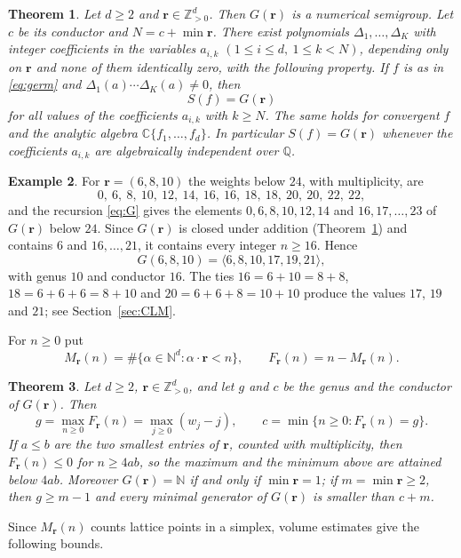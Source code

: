 \documentclass{amsart}
\newtheorem{theorem}{Theorem}[section]
\theoremstyle{definition}
\newtheorem{example}[theorem]{Example}
\numberwithin{equation}{section}
\newcommand{\N}{\mathbb{N}}
\newcommand{\Z}{\mathbb{Z}}
\newcommand{\Q}{\mathbb{Q}}
\newcommand{\C}{\mathbb{C}}
\newcommand{\bfr}{\mathbf{r}}
\newcommand{\gen}[1]{\langle #1\rangle}
\begin{document}
\begin{theorem}\label{thm:main}
Let $d\ge2$ and $\bfr\in\Z_{>0}^d$. Then $G(\bfr)$ is a numerical semigroup.
Let $c$ be its conductor and $N=c+\min\bfr$. There exist polynomials
$\Delta_1,\dots,\Delta_K$ with integer coefficients in the variables $a_{i,k}$
$(1\le i\le d,\ 1\le k<N)$, depending only on $\bfr$ and none of them
identically zero, with the following property. If $f$ is as in
\eqref{eq:germ} and $\Delta_1(a)\cdots\Delta_K(a)\ne0$, then
\[
  S(f)=G(\bfr)
\]
for all values of the coefficients $a_{i,k}$ with $k\ge N$. The same holds for
convergent $f$ and the analytic algebra $\C\{f_1,\dots,f_d\}$. In particular
$S(f)=G(\bfr)$ whenever the coefficients $a_{i,k}$ are algebraically
independent over $\Q$.
\end{theorem}

\begin{example}\label{ex:6810}
For $\bfr=(6,8,10)$ the weights below $24$, with multiplicity, are
\[
  0,\ 6,\ 8,\ 10,\ 12,\ 14,\ 16,\ 16,\ 18,\ 18,\ 20,\ 20,\ 22,\ 22,
\]
and the recursion \eqref{eq:G} gives the elements $0,6,8,10,12,14$ and
$16,17,\dots,23$ of $G(\bfr)$ below $24$. Since $G(\bfr)$ is closed under
addition (Theorem~\ref{thm:main}) and contains $6$ and $16,\dots,21$, it
contains every integer $n\ge16$. Hence
\[
  G(6,8,10)=\gen{6,8,10,17,19,21},
\]
with genus $10$ and conductor $16$. The ties $16=6+10=8+8$, $18=6+6+6=8+10$
and $20=6+6+8=10+10$ produce the values $17$, $19$ and $21$; see
Section~\ref{sec:CLM}.
\end{example}

For $n\ge0$ put
\[
  M_{\bfr}(n)=\#\{\alpha\in\N^d:\alpha\cdot\bfr<n\},
  \qquad
  F_{\bfr}(n)=n-M_{\bfr}(n).
\]

\begin{theorem}\label{thm:genus}
Let $d\ge2$, $\bfr\in\Z_{>0}^d$, and let $g$ and $c$ be the genus and the
conductor of $G(\bfr)$. Then
\[
  g=\max_{n\ge0}F_{\bfr}(n)=\max_{j\ge0}(w_j-j),
  \qquad
  c=\min\{n\ge0:F_{\bfr}(n)=g\}.
\]
If $a\le b$ are the two smallest entries of $\bfr$, counted with
multiplicity, then $F_{\bfr}(n)\le0$ for
$n\ge4ab$, so the maximum and the minimum above are attained below $4ab$. Moreover
$G(\bfr)=\N$ if and only if $\min\bfr=1$; if $m=\min\bfr\ge2$, then
$g\ge m-1$ and every minimal generator of $G(\bfr)$ is smaller than $c+m$.
\end{theorem}

Since $M_{\bfr}(n)$ counts lattice points in a simplex, volume estimates give
the following bounds.
\end{document}
